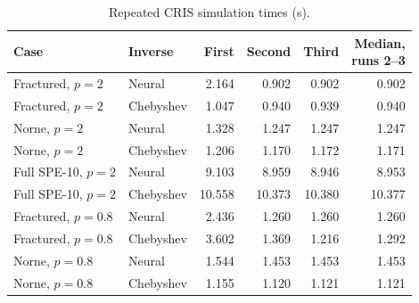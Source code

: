 \begin{table}[htbp]\centering\small
\caption{Repeated CRIS simulation times (s).}\label{tab:si-nn-timing-sequence}
\begin{tabular}{llrrrr}\toprule
Case & Inverse & First & Second & Third & \shortstack{Median,\\runs 2--3}\\\midrule
Fractured, $p=2$ & Neural & 2.164 & 0.902 & 0.902 & 0.902\\
Fractured, $p=2$ & Chebyshev & 1.047 & 0.940 & 0.939 & 0.940\\
Norne, $p=2$ & Neural & 1.328 & 1.247 & 1.247 & 1.247\\
Norne, $p=2$ & Chebyshev & 1.206 & 1.170 & 1.172 & 1.171\\
Full SPE-10, $p=2$ & Neural & 9.103 & 8.959 & 8.946 & 8.953\\
Full SPE-10, $p=2$ & Chebyshev & 10.558 & 10.373 & 10.380 & 10.377\\
Fractured, $p=0.8$ & Neural & 2.436 & 1.260 & 1.260 & 1.260\\
Fractured, $p=0.8$ & Chebyshev & 3.602 & 1.369 & 1.216 & 1.292\\
Norne, $p=0.8$ & Neural & 1.544 & 1.453 & 1.453 & 1.453\\
Norne, $p=0.8$ & Chebyshev & 1.155 & 1.120 & 1.121 & 1.121\\
\bottomrule\end{tabular}
\end{table}
